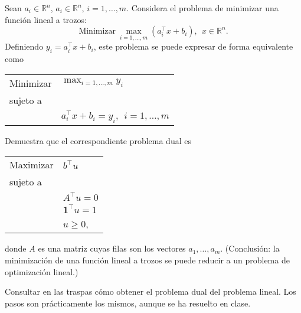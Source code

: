 \begin{problem}[9]

Sean $a_i\in\mathbb{R}^n$, $a_i\in\mathbb{R}^n$, $i=1,\ldots,m$.
%
Considera el problema de minimizar una función lineal a trozos:
\[
\mbox{Minimizar}\ \max_{i=1,\ldots,m} (a_i^\top x + b_i),\ \ x\in\mathbb{R}^n.
\]
Definiendo $y_i=a_i^\top x + b_i$, este problema se puede expresar de forma equivalente como
\begin{center}
\begin{tabular}{ll}
Minimizar & $\displaystyle{\max_{i=1,\ldots,m}} y_i$ \\
sujeto a & \\
& $a_i^\top x + b_i=y_i,\ \ i=1,\ldots,m$
\end{tabular}
\end{center}
Demuestra que el correspondiente problema dual es
\begin{center}
\begin{tabular}{ll}
Maximizar & $b^\top u$ \\
sujeto a & \\
& $A^\top u=0$ \\
& $\mathbf{1}^\top u = 1$\\
& $u\geq 0$,
 \end{tabular}
\end{center}
donde $A$ es una matriz cuyas filas son los vectores $a_1,\ldots,a_m$.
(Conclusión: la minimización de una función lineal a trozos se puede reducir a un problema de optimización lineal.)


\solution
Consultar en las traspas cómo obtener el problema dual del problema lineal. 
%
Los pasos son prácticamente los mismos, aunque se ha resuelto en clase.

\end{problem}


